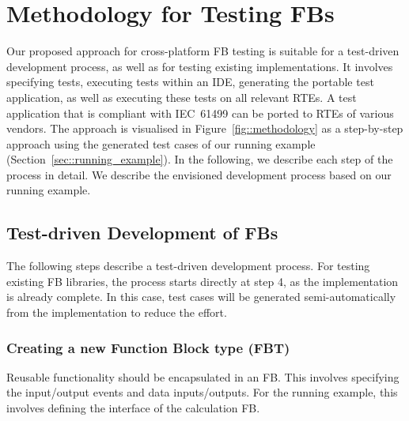 \section{Methodology for Testing FBs}
\label{sec::methodology}
Our proposed approach for cross-platform FB testing is suitable for a test-driven development process, as well as for testing existing implementations. It involves specifying tests, executing tests within an IDE, generating the portable test application, as well as executing these tests on all relevant RTEs. A test application that is compliant with IEC~61499 can be ported to RTEs of various vendors. The approach is visualised in Figure~\ref{fig::methodology} as a step-by-step approach using the generated test cases of our running example (Section~\ref{sec::running_example}). In the following, we describe each step of the process in detail. We describe the envisioned development process based on our running example. %

\subsection{Test-driven Development of FBs}
The following steps describe a test-driven development process. For testing existing FB libraries, the process starts directly at step 4, as the implementation is already complete. In this case, test cases will be generated semi-automatically from the implementation to reduce the effort.

\subsubsection{Creating a new Function Block type (FBT)}
Reusable functionality should be encapsulated in an FB. This involves specifying the input/output events and data inputs/outputs. %
For the running example, this involves defining the interface of the calculation FB.

